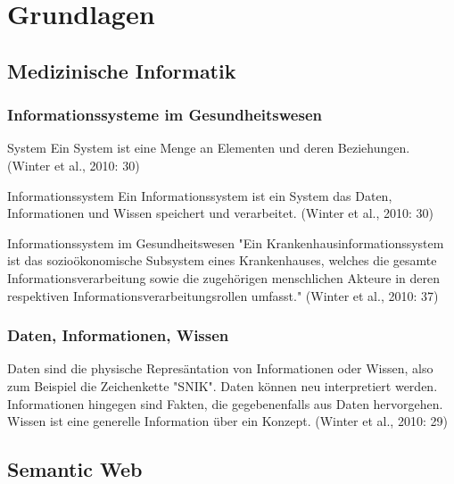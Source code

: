 \chapter{Grundlagen}\label{ch:preliminaries}

\section{Medizinische Informatik}

\subsection{Informationssysteme im Gesundheitswesen}

\begin{definition}{System}
Ein System ist eine Menge an Elementen und deren Beziehungen. (Winter et al., 2010: 30)
\end{definition}

\begin{definition}{Informationssystem}
Ein Informationssystem ist ein System das Daten, Informationen und Wissen speichert und verarbeitet. (Winter et al., 2010: 30)
\end{definition}

\begin{definition}{Informationssystem im Gesundheitswesen}
"Ein Krankenhausinformationssystem ist das sozioökonomische Subsystem eines Krankenhauses, welches die gesamte Informationsverarbeitung sowie die zugehörigen menschlichen Akteure in deren respektiven Informationsverarbeitungsrollen umfasst." (Winter et al., 2010: 37)
\end{definition}

\subsection{Daten, Informationen, Wissen}
Daten sind die physische Represäntation von Informationen oder Wissen, also zum Beispiel die Zeichenkette "SNIK". Daten können neu interpretiert werden.
Informationen hingegen sind Fakten, die gegebenenfalls aus Daten hervorgehen.
Wissen ist eine generelle Information über ein Konzept. (Winter et al., 2010: 29)

\section{Semantic Web}

